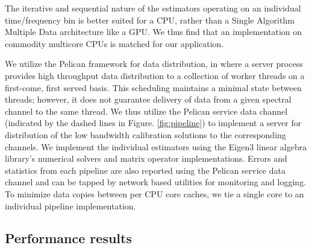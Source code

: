 \documentclass{aa}
\begin{document}
The iterative and sequential nature of the estimators operating on an individual
time/frequency bin  is better suited for  a CPU, rather than  a Single Algorithm
Multiple Data architecture  like a GPU.  We thus find  that an implementation on
commodity multicore CPUs is matched for our application.

We   utilize   the  Pelican   \citep{salvini2011pelican}   framework  for   data
distribution,  in   where  a  server  process  provides   high  throughput  data
distribution to  a collection  of worker threads  on a first-come,  first served
basis. This scheduling maintains a minimal  state between threads; however, it does
not guarantee delivery of data from a given spectral channel to the same thread.
We thus utilize the Pelican service  data channel (indicated by the dashed lines
in Figure.   \ref{fig:pipeline}) to implement  a server for distribution  of the
low bandwidth calibration solutions  to the corresponding channels. We implement
the  individual  estimators using  the  Eigen3  \citep{eigenweb} linear  algebra
library's  numerical solvers  and matrix  operator implementations.   Errors and
statistics from each  pipeline are also reported using  the Pelican service data
channel and  can be  tapped  by network  based  utilities  for monitoring  and
logging. To  minimize data copies between per  CPU core caches, we  tie a single
core to an individual pipeline implementation.


\subsection{Performance results}
\end{document}
